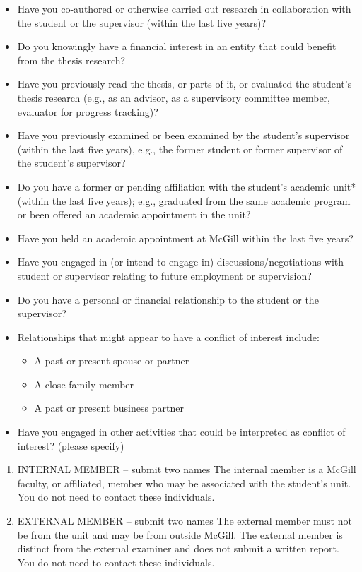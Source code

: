 \documentclass[
  openany]{book}
\providecommand{\tightlist}{%
  \setlength{\itemsep}{0pt}\setlength{\parskip}{0pt}}
\begin{document}
\begin{itemize}
\tightlist
\item
  Have you co-authored or otherwise carried out research in collaboration with the student or the supervisor (within the last five years)?
\item
  Do you knowingly have a financial interest in an entity that could benefit from the thesis research?
\item
  Have you previously read the thesis, or parts of it, or evaluated the student's thesis research (e.g., as an advisor, as a supervisory committee member, evaluator for progress tracking)?
\item
  Have you previously examined or been examined by the student's supervisor (within the last five years), e.g., the former student or former supervisor of the student's supervisor?
\item
  Do you have a former or pending affiliation with the student's academic unit* (within the last five years); e.g., graduated from the same academic program or been offered an academic appointment in the unit?
\item
  Have you held an academic appointment at McGill within the last five years?
\item
  Have you engaged in (or intend to engage in) discussions/negotiations with student or supervisor relating to future employment or supervision?
\item
  Do you have a personal or financial relationship to the student or the supervisor?
\item
  Relationships that might appear to have a conflict of interest include:

  \begin{itemize}
  \tightlist
  \item
    A past or present spouse or partner
  \item
    A close family member
  \item
    A past or present business partner
  \end{itemize}
\item
  Have you engaged in other activities that could be interpreted as conflict of interest? (please specify)
\end{itemize}

\begin{enumerate}
\def\labelenumi{\arabic{enumi}.}
\setcounter{enumi}{2}
\item
  INTERNAL MEMBER -- submit two names
  The internal member is a McGill faculty, or affiliated, member who may be associated with the student's unit. You do not need to contact these individuals.
\item
  EXTERNAL MEMBER -- submit two names
  The external member must not be from the unit and may be from outside McGill. The external member is distinct from the external examiner and does not submit a written report. You do not need to contact these individuals.
\end{enumerate}
\end{document}
